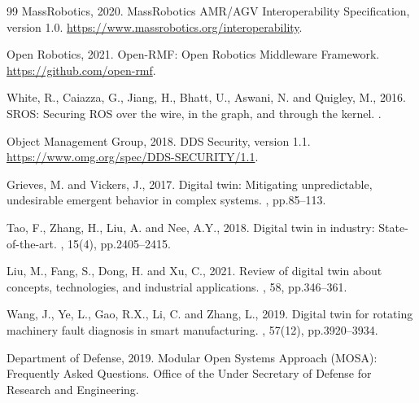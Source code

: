 \documentclass[a4paper,fleqn]{cas-dc}
\begin{document}
\begin{thebibliography}{99}
MassRobotics, 2020.
\newblock MassRobotics AMR/AGV Interoperability Specification, version 1.0.
\newblock \url{https://www.massrobotics.org/interoperability}.

Open Robotics, 2021.
\newblock Open-RMF: Open Robotics Middleware Framework.
\newblock \url{https://github.com/open-rmf}.

White, R., Caiazza, G., Jiang, H., Bhatt, U., Aswani, N. and Quigley, M., 2016.
\newblock SROS: Securing ROS over the wire, in the graph, and through the kernel.
.

Object Management Group, 2018.
\newblock DDS Security, version 1.1.
\newblock \url{https://www.omg.org/spec/DDS-SECURITY/1.1}.

Grieves, M. and Vickers, J., 2017.
\newblock Digital twin: Mitigating unpredictable, undesirable emergent behavior in complex systems.
, pp.85--113.

Tao, F., Zhang, H., Liu, A. and Nee, A.Y., 2018.
\newblock Digital twin in industry: State-of-the-art.
, 15(4), pp.2405--2415.

Liu, M., Fang, S., Dong, H. and Xu, C., 2021.
\newblock Review of digital twin about concepts, technologies, and industrial applications.
, 58, pp.346--361.

Wang, J., Ye, L., Gao, R.X., Li, C. and Zhang, L., 2019.
\newblock Digital twin for rotating machinery fault diagnosis in smart manufacturing.
, 57(12), pp.3920--3934.

Department of Defense, 2019.
\newblock Modular Open Systems Approach (MOSA): Frequently Asked Questions.
\newblock Office of the Under Secretary of Defense for Research and Engineering.

\end{thebibliography}



\end{document}
